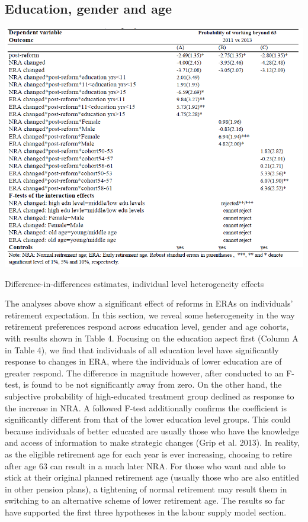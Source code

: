 \documentclass[a4paper]{article}
\begin{document}
\subsection{Education, gender and age}

\begin{table}[h] 
    \centering
    \includegraphics[width=1\linewidth]{table4.png}
    \caption{Difference-in-differences estimates, individual level heterogeneity effects}
    \label{4}
\end{table}

The analyses above show a significant effect of reforms in ERAs on individuals’ retirement expectation. In this section, we reveal some heterogeneity in the way retirement preferences respond across education level, gender and age cohorts, with results shown in Table 4. Focusing on the education aspect first (Column A in Table 4), we find that individuals of all education level have significantly response to changes in ERA, where the individuals of lower education are of greater respond. The difference in magnitude however, after conducted to an F-test, is found to be not significantly away from zero. On the other hand, the subjective probability of high-educated treatment group declined as response to the increase in NRA. A followed F-test additionally confirms the coefficient is significantly different from that of the lower education level groups. This could because individuals of better educated are usually those who have the knowledge and access of information to make strategic changes (Grip et al. 2013). In reality, as the eligible retirement age for each year is ever increasing, choosing to retire after age 63 can result in a much later NRA. For those who want and able to stick at their original planned retirement age (usually those who are also entitled in other pension plans), a tightening of normal retirement may result them in switching to an alternative scheme of lower retirement age. The results so far have supported the first three hypotheses in the labour supply model section.
\end{document}
